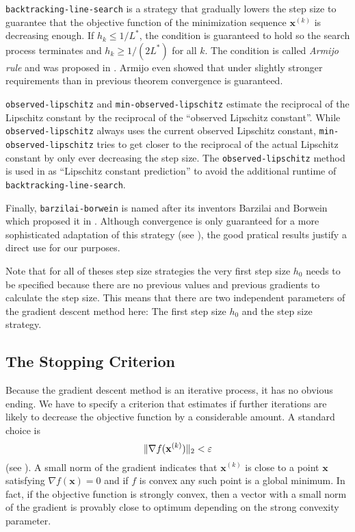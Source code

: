 \texttt{backtracking-line-search} is a strategy that gradually lowers the step size
to guarantee that the objective function of the minimization sequence \(\mathbf{x}^{(k)}\) is decreasing enough.
If \(h_k \leq 1/L^*\), the condition is guaranteed to hold so the search process terminates and \(h_k \geq 1/(2L^*)\) for all \(k\).
The condition is called \emph{Armijo rule} and was proposed in \cite{Armijo-ArmijoRule}.
Armijo even showed that under slightly stronger requirements than in previous theorem convergence is guaranteed.

\texttt{observed-lipschitz} and \texttt{min-observed-lipschitz} estimate the reciprocal of the Lipschitz constant by the reciprocal of the 
\enquote{observed Lipschitz constant}.
While \texttt{observed-lipschitz} always uses the current observed Lipschitz constant, 
\texttt{min-observed-lipschitz} tries to get closer to the reciprocal of the actual Lipschitz constant by only ever decreasing the step size.
The \texttt{observed-lipschitz} method is used in \cite{LuChenChangShaHuangTengCheng-ePlace} as \enquote{Lipschitz constant prediction}
to avoid the additional runtime of \texttt{backtracking-line-search}.

Finally, \texttt{barzilai-borwein} is named after its inventors Barzilai and Borwein which proposed it in \cite{BarzilaiBorwein-StepSizeGradientMethods}.
Although convergence is only guaranteed for a more sophisticated adaptation of this strategy (see \cite{Raydan-GlobalBarzilaiBorwein}),
the good pratical results justify a direct use for our purposes.

Note that for all of theses step size strategies the very first step size \(h_0\) needs to be specified
because there are no previous values and previous gradients to calculate the step size.
This means that there are two independent parameters of the gradient descent method here:
The first step size \(h_0\) and the step size strategy.



\subsection{The Stopping Criterion} \label{subsec:stopping_criterion}

Because the gradient descent method is an iterative process, it has no obvious ending.
We have to specify a criterion that estimates if further iterations are likely to decrease the objective function by a considerable amount.
A standard choice is
\[ \lVert\nabla f(\mathbf{x}^{(k)})\rVert_2 < \varepsilon \]
(see \cite[p. 466]{BoydVandenberghe-ConvexOptimization}).
A small norm of the gradient indicates that \(\mathbf{x}^{(k)}\) is close to a point \(\mathbf{x}\) satisfying \(\nabla f(\mathbf{x}) = 0\)
and if \(f\) is convex any such point is a global minimum.
In fact, if the objective function is strongly convex,
then a vector with a small norm of the gradient is provably close to optimum
depending on the strong convexity parameter.



